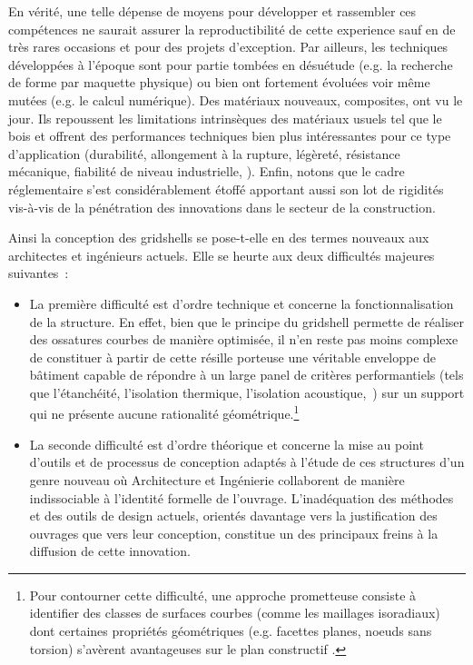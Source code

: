 En vérité, une telle dépense de moyens pour développer et rassembler ces compétences ne saurait assurer la reproductibilité de cette experience sauf en de très rares occasions et pour des projets d'exception. Par ailleurs, les techniques développées à l'époque sont pour partie tombées en désuétude (e.g. la recherche de forme par maquette physique) ou bien ont fortement évoluées voir même mutées (e.g. le calcul numérique). Des matériaux nouveaux, composites, ont vu le jour. Ils repoussent les limitations intrinsèques des matériaux usuels tel que le bois et offrent des performances techniques bien plus intéressantes pour ce type d'application (durabilité, allongement à la rupture, légèreté, résistance mécanique, fiabilité de niveau industrielle, \telp{}). Enfin, notons que le cadre réglementaire s'est considérablement étoffé apportant aussi son lot de rigidités vis-à-vis de la pénétration des innovations dans le secteur de la construction.

Ainsi la conception des gridshells se pose-t-elle en des termes nouveaux aux architectes et ingénieurs actuels. Elle se heurte aux deux difficultés majeures suivantes~:
\begin{itemize}
\item
La première difficulté est d'ordre technique et concerne la fonctionnalisation de la structure. En effet, bien que le principe du gridshell permette de réaliser des ossatures courbes de manière optimisée, il n'en reste pas moins complexe de constituer à partir de cette résille porteuse une véritable enveloppe de bâtiment capable de répondre à un large panel de critères performantiels (tels que l'étanchéité, l'isolation thermique, l'isolation acoustique,~\telp{}) sur un support qui ne présente aucune rationalité géométrique.\footnote{Pour contourner cette difficulté, une approche prometteuse consiste à identifier des classes de surfaces courbes (comme les maillages isoradiaux) dont certaines propriétés géométriques (e.g. facettes planes, noeuds sans torsion) s'avèrent avantageuses sur le plan constructif \cite{Mesnil2017}.}
\item
La seconde difficulté est d'ordre théorique et concerne la mise au point d'outils et de processus de conception adaptés à l'étude de ces structures d'un genre nouveau où Architecture et Ingénierie collaborent de manière indissociable à l'identité formelle de l'ouvrage. L'inadéquation des méthodes et des outils de design actuels, orientés davantage vers la justification des ouvrages que vers leur conception, constitue un des principaux freins à la diffusion de cette innovation.
\end{itemize}

